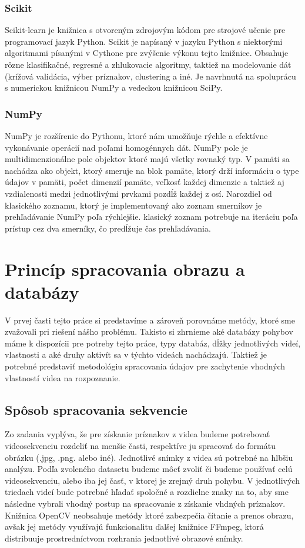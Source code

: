 \subsubsection{Scikit}
Scikit-learn je knižnica s otvoreným zdrojovým kódom pre strojové učenie pre programovací jazyk Python. Scikit je napísaný v jazyku Python s niektorými algoritmami písanými v Cythone pre zvýšenie výkonu tejto knižnice. Obsahuje rôzne klasifikačné, regresné a zhlukovacie algoritmy, taktiež na modelovanie dát (krížová validácia, výber príznakov, clustering a iné. Je navrhnutá na spoluprácu s numerickou knižnicou NumPy a vedeckou knižnicou SciPy. \cite{c5}

\subsubsection{NumPy}
NumPy je rozšírenie do Pythonu, ktoré nám umožňuje rýchle a efektívne vykonávanie operácií nad poľami homogénnych dát. NumPy pole je multidimenzionálne pole objektov ktoré majú všetky rovnaký typ. V pamäti sa nachádza ako objekt, ktorý smeruje na blok pamäte, ktorý drží informáciu o type údajov v pamäti, počet dimenzií pamäte, veľkosť každej dimenzie a taktiež aj vzdialenosti medzi jednotlivými prvkami pozdĺž každej z osí. Narozdiel od klasického zoznamu, ktorý je implementovaný ako zoznam smerníkov je prehľadávanie NumPy poľa rýchlejšie. klasický zoznam potrebuje na iteráciu poľa prístup cez dva smerníky, čo predĺžuje čas prehľadávania.\cite{c8}


\section{Princíp spracovania obrazu a databázy}
V prvej časti tejto práce si predstavíme a zároveň porovnáme metódy, ktoré sme zvažovali pri riešení nášho problému. Takisto si zhrnieme aké databázy pohybov máme k dispozícii pre potreby tejto práce, typy databáz, dĺžky jednotlivých videí, vlastnosti a aké druhy aktivít sa v týchto videách nachádzajú. Taktiež je potrebné predstaviť metodológiu spracovania údajov pre zachytenie vhodných vlastností videa na rozpoznanie.

\subsection{Spôsob spracovania sekvencie}
Zo zadania vyplýva, že pre získanie príznakov z videa budeme potrebovať videosekvenciu rozdeliť na menšie časti, respektíve ju spracovať do formátu obrázku (.jpg, .png. alebo iné). Jednotlivé snímky z videa sú potrebné na hlbšiu analýzu. Podľa zvoleného datasetu budeme môcť zvoliť či budeme používať celú videosekvenciu, alebo iba jej časť, v ktorej je zrejmý druh pohybu. V jednotlivých triedach videí bude potrebné hľadať spoločné a rozdielne znaky na to, aby sme následne vybrali vhodný postup na spracovanie z získanie vhdných príznakov. Knižnica OpenCV neobsahuje metódy ktoré zabezpečia čítanie a prenos obrazu, avšak jej metódy využívajú funkcionalitu ďalšej knižnice FFmpeg, ktorá distribuuje prostredníctvom rozhrania jednotlivé obrazové snímky. 

